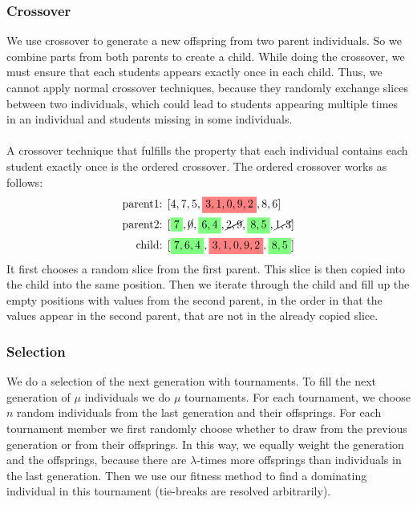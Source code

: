 \documentclass[12pt,a4paper]{article}
\newcommand{\highlight}[1]{%
  \colorbox{red!50}{$\displaystyle#1$}}
\newcommand{\highlightg}[1]{%
  \colorbox{green!50}{$\displaystyle#1$}}
\begin{document}
\subsubsection{Crossover}
We use crossover to generate a new offspring from two parent individuals. So we combine parts from both parents to create a child. While doing the crossover, we must ensure that each students appears exactly once in each child. Thus, we cannot apply normal crossover techniques, because they randomly exchange slices between two individuals, which could lead to students appearing multiple times in an individual and students missing in some individuals.\\
\\
A crossover technique that fulfills the property that each individual contains each student exactly once is the ordered crossover. The ordered crossover works as follows:
\begin{align*}
    \text{parent1: } &[4, 7, 5, \highlight{3, 1, 0, 9, 2}, 8, 6]\\
    \text{parent2: } &[\highlightg{7}, \cancel{0}, \highlightg{6, 4}, \cancel{2, 9}, \highlightg{8, 5}, \cancel{1, 3}]\\
    \text{child: }   &[\highlightg{7, 6, 4}, \highlight{3, 1, 0, 9, 2}, \highlightg{8, 5}]
\end{align*}
It first chooses a random slice from the first parent. This slice is then copied into the child into the same position. Then we iterate through the child and fill up the empty positions with values from the second parent, in the order in that the values appear in the second parent, that are not in the already copied slice.

\subsubsection{Selection}
We do a selection of the next generation with tournaments. To fill the next generation of $\mu$ individuals we do $\mu$ tournaments. For each tournament, we choose $n$ random individuals from the last generation and their offsprings. For each tournament member we first randomly choose whether to draw from the previous generation or from their offsprings. In this way, we equally weight the generation and the offsprings, because there are $\lambda$-times more offsprings than individuals in the last generation. Then we use our fitness method to find a dominating individual in this tournament (tie-breaks are resolved arbitrarily). 
\end{document}
